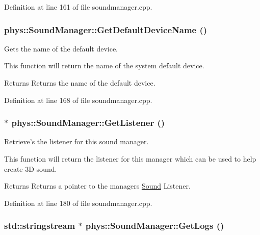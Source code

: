 Definition at line 161 of file soundmanager.cpp.

\hypertarget{classphys_1_1SoundManager_ac4814331683597034b26fac5c1c69bfa}{
\subsubsection[{GetDefaultDeviceName}]{ phys::SoundManager::GetDefaultDeviceName ()}}
\label{d1/dc4/classphys_1_1SoundManager_ac4814331683597034b26fac5c1c69bfa}


Gets the name of the default device. 

This function will return the name of the system default device. \begin{DoxyReturn}{Returns}
Returns the name of the default device. 
\end{DoxyReturn}


Definition at line 168 of file soundmanager.cpp.

\hypertarget{classphys_1_1SoundManager_af0c700e283c44c20466185e1150fc6a3}{
\subsubsection[{GetListener}]{ $\ast$ phys::SoundManager::GetListener ()}}
\label{d1/dc4/classphys_1_1SoundManager_af0c700e283c44c20466185e1150fc6a3}


Retrieve's the listener for this sound manager. 

This function will return the listener for this manager which can be used to help create 3D sound. \begin{DoxyReturn}{Returns}
Returns a pointer to the managers \hyperlink{classphys_1_1Sound}{Sound} Listener. 
\end{DoxyReturn}


Definition at line 180 of file soundmanager.cpp.

\hypertarget{classphys_1_1SoundManager_a284fbc2fdbecdf66e717366b09e2c9da}{
\subsubsection[{GetLogs}]{\setlength{\rightskip}{0pt plus 5cm}std::stringstream $\ast$ phys::SoundManager::GetLogs ()}}
\label{d1/dc4/classphys_1_1SoundManager_a284fbc2fdbecdf66e717366b09e2c9da}


